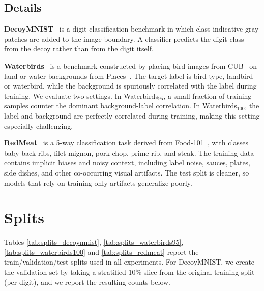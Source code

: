 \documentclass[10pt,twocolumn,letterpaper]{article}
\begin{document}
\subsection{Details}\label{datasetdetails}
\textbf{DecoyMNIST}~\cite{erion2021improving} is a digit-classification benchmark in which class-indicative gray patches are added to the image boundary. A classifier predicts the digit class from the decoy rather than from the digit itself.

\textbf{Waterbirds}~\cite{sagawa2019distributionally}  is a benchmark constructed by placing bird images from CUB~\cite{wah2011caltech}  on land or water backgrounds from Places~\cite{zhou2017places}. The target label is bird type, landbird or waterbird, while the background is spuriously correlated with the label during training. We evaluate two settings. In Waterbirds$_{95}$, a small fraction of training samples counter the dominant background-label correlation. In Waterbirds$_{100}$, the label and background are perfectly correlated during training, making this setting especially challenging.

\textbf{RedMeat}~\cite{petryk2022guiding} is a 5-way classification task derived from Food-101~\cite{bossard2014food}, with classes baby back ribs, filet mignon, pork chop, prime rib, and steak. The training data contains implicit biases and noisy context, including label noise, sauces, plates, side dishes, and other co-occurring visual artifacts. The test split is cleaner, so models that rely on training-only artifacts generalize poorly.
\section{Splits}
\label{sec:supp_dataset_splits}

Tables \ref{tab:splits_decoymnist}, \ref{tab:splits_waterbirds95}, \ref{tab:splits_waterbirds100} and \ref{tab:splits_redmeat} report the train/validation/test splits used in all experiments. For DecoyMNIST, we create the validation set by taking a stratified 10\% slice from the original training split (per digit), and we report the resulting counts below.
\end{document}

